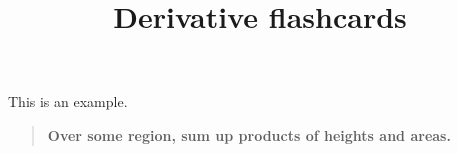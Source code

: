 \documentclass{ximera}
\title{Derivative flashcards}
\begin{document}
\begin{example}
  This is an example.
\end{example}

\begin{quote}
\textbf{Over \textcolor{red!50!black}{some region},
\textcolor{green!70!black!70!blue}{sum up} products of
\textcolor{purple!50!blue!90!black}{heights} and \textcolor{blue!70!green}{areas}.}
\end{quote}
\end{document}
